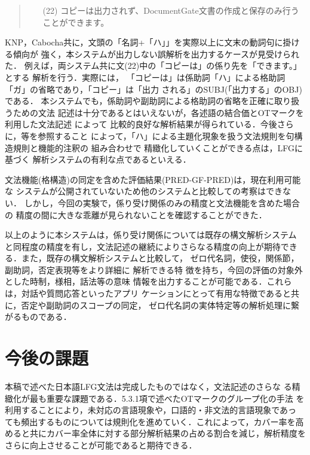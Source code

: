 \begin{quote}
\begin{itemize}
\item[(22)] コピーは出力されず、DocumentGate文書の作成と保存のみ行うことができます。
\end{itemize}
\end{quote}
KNP，Cabocha共に，文頭の「名詞+「ハ」」を実際以上に文末の動詞句に掛ける傾向が
強く，本システムが出力しない誤解析を出力するケースが見受けられた．
例えば，両システム共に文(22)中の「コピーは」の係り先を「できます。」とする
解析を行う．実際には，
「コピーは」は係助詞「ハ」による格助詞「ガ」の省略であり，「コピー」は「出力
される」のSUBJ(「出力する」のOBJ)である．
本システムでも，係助詞や副助詞による格助詞の省略を正確に取り扱うための文法
記述は十分であるとはいえないが，各述語の結合価とOTマークを利用した文法記述
によって
比較的良好な解析結果が得られている．今後さらに，\cite{minami}等を参照すること
によって，「ハ」による主題化現象を扱う文法規則を句構造規則と機能的注釈の
組み合わせで
精緻化していくことができる点は，LFGに基づく
解析システムの有利な点であるといえる．

文法機能(格構造)の同定を含めた評価結果(PRED-GF-PRED)は，現在利用可能な
システムが公開されていないため他のシステムと比較しての考察はできない．
しかし，今回の実験で，係り受け関係のみの精度と文法機能を含めた場合の
精度の間に大きな乖離が見られないことを確認することができた．

以上のように本システムは，係り受け関係については既存の構文解析システム
と同程度の精度を有し，文法記述の継続によりさらなる精度の向上が期待でき
る．また，既存の構文解析システムと比較して，
ゼロ代名詞，使役，関係節，副助詞，否定表現等をより詳細に
解析できる特\break
徴を持ち，今回の評価の対象外とした時制，様相，話法等の意味
情報を出力することが可能である．これらは，対話や質問応答といったアプリ
ケーションにとって有用な特徴であると共に，否定や副助詞のスコープの同定，
ゼロ代名詞の実体特定等の解析処理に繋がるものである．

\section{今後の課題}
本稿で述べた日本語LFG文法は完成したものではなく，文法記述のさらな
る精緻化が最も重要な課題である．5.3.1項で述べたOTマークのグループ化の手法
を利用することにより，未対応の言語現象や，口語的・非文法的言語現象であっ
ても頻出するものについては規則化を進めていく．これによって，カバー率を高
めると共にカバー率全体に対する部分解析結果の占める割合を減じ，解析精度を
さらに向上させることが可能であると期待できる． 


